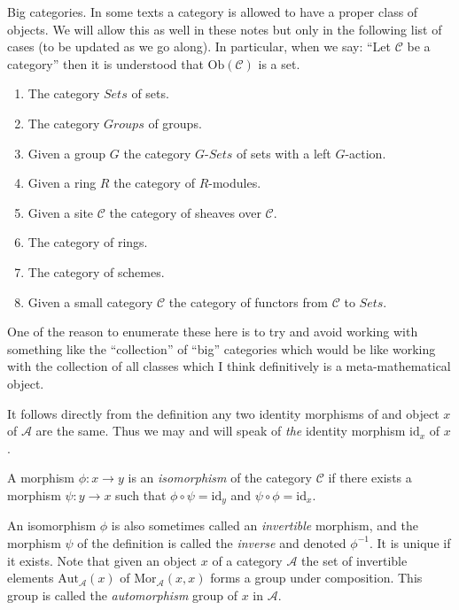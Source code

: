 \begin{remark}
\label{remark-big-categories}
Big categories. In some texts a category is allowed to have a proper
class of objects. We will allow this as well in these notes but only
in the following list of cases (to be updated as we go along).
In particular, when we say: ``Let $\mathcal{C}$ be a category''
then it is understood that $\text{Ob}(\mathcal{C})$ is a set.
\begin{enumerate}
\item The category $\textit{Sets}$ of sets.
\item The category $\textit{Groups}$ of groups.
\item Given a group $G$ the category $G\textit{-Sets}$ of
sets with a left $G$-action.
\item Given a ring $R$ the category of $R$-modules.
\item Given a site $\mathcal{C}$ the category of sheaves
over $\mathcal{C}$.
\item The category of rings.
\item The category of schemes.
\item Given a small category $\mathcal{C}$ the category of functors
from $\mathcal{C}$ to $\textit{Sets}$.
\end{enumerate}
One of the reason to enumerate these here is to try and avoid 
working with something like the ``collection'' of ``big'' categories
which would be like working with the collection of all classes
which I think definitively is a meta-mathematical object.
\end{remark}

\begin{remark}
\label{remark-unique-indentity}
It follows directly from the definition any two identity morphisms
of and object $x$ of $\mathcal{A}$ are the same. Thus we may and will
speak of {\it the} identity morphism $\text{id}_x$ of $x$.
\end{remark}

\begin{definition}
\label{definition-isomorphism}
A morphism $\phi : x \to y$ is an {\it isomorphism} of the category
$\mathcal{C}$ if there exists a morphism $\psi : y \to x$
such that $\phi \circ \psi = \text{id}_y$ and
$\psi \circ \phi = \text{id}_x$.
\end{definition}

\noindent
An isomorphism $\phi$ is also sometimes called an {\it invertible}
morphism, and the morphism $\psi$ of the definition is called the
{\it inverse} and denoted $\phi^{-1}$. It is unique if it exists. Note that
given an object $x$ of a category $\mathcal{A}$ the set of invertible
elements $\text{Aut}_{\mathcal{A}}(x)$
of $\text{Mor}_{\mathcal{A}}(x,x)$ forms a group under composition. 
This group is called the {\it automorphism} group of $x$ in $\mathcal{A}$.

